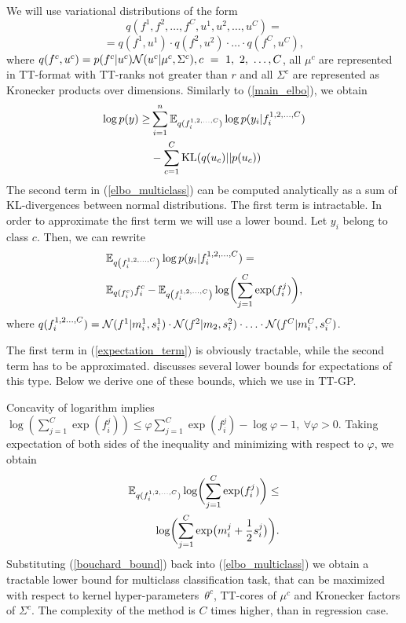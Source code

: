   We will use variational distributions of the form
  \[
    q(f^1, f^2, \ldots, f^C, u^1, u^2, \ldots, u^C) =
  \]
  \[
    = q(f^1, u^1) \cdot q(f^2, u^2) \cdot \ldots \cdot q(f^C, u^C),
  \]
  where $q(f^c, u^c) = p(f^c | u^c) \mathcal{N}(u^c | \mu^c, \Sigma^c), c~=~1,~2,~\ldots,\\C$,
  all $\mu^c$ are represented in TT-format with TT-ranks not greater than $r$
  and all  $\Sigma^c$ are represented as Kronecker products over dimensions. 
  Similarly to (\ref{main_elbo}), we obtain
  \begin{equation}
  \label{elbo_multiclass}
  \begin{split}
    \log p(y) \ge & \sum_{i = 1}^n \mathbb{E}_{q(f_i^{1, 2, \ldots, C})} \log p(y_i | f_i^{1, 2, \ldots, C})
    \\
    & - \sum_{c = 1}^{C} \mbox{KL}(q(u_c) || p(u_c))
  \end{split}
  \end{equation}
  The second term in (\ref{elbo_multiclass}) can be computed analytically as
  a sum of KL-divergences between normal distributions. The first term is
  intractable. In order to approximate the first term we will use a lower bound.
  Let $y_i$ belong to class $c$. Then, we can rewrite
  \begin{equation}
  \label{expectation_term}
  \begin{split}
    &\mathbb{E}_{q\left(f_i^{1, 2, \ldots, C}\right)} \log p(y_i | f_i^{1, 2, \ldots, C}) =\\
    &\mathbb{E}_{q(f_i^c)} f_i^c - \mathbb{E}_{q\left(f_i^{1, 2, \ldots, C}\right)}
    \log \biggl(\sum_{j=1}^C \exp (f_i^j) \biggr),
  \end{split}
  \end{equation}
  where $q(f_i^{1, 2\ldots, C}) = \mathcal{N}(f^1 | m_i^1, s_i^1)\cdot \mathcal{N}(f^2| m_2, s_i^2) \cdot \ldots \cdot \mathcal{N}(f^C | m_i^C, s_i^C)$.

  The first term in (\ref{expectation_term}) is obviously tractable, while the
  second term has to be approximated. \citet{bouchard2007} discusses several
  lower bounds for expectations of this type. Below we derive one of these bounds,
  which we use in TT-GP.

  Concavity of logarithm implies $\log\left(\sum_{j=1}^{C} \exp(f_i^j)\right) \le 
  \varphi \sum_{j=1}^C \exp(f_i^j) - \log \varphi - 1,\ \forall\varphi > 0$. 
  Taking expectation of both sides of the inequality and minimizing with respect
  to $\varphi$, we obtain
  \begin{equation}
  \label{bouchard_bound}
  \begin{split}
    \mathbb{E}_{q(f_i^{1, 2, \ldots, C})} \log\biggl(\sum_{j=1}^C \exp(f_i^j)\biggr) \le
    \\
    \log \biggl(\sum_{j=1}^C \exp\bigl(m_i^j + \frac 1 2 s_i^j\bigr) \biggr).
  \end{split}
  \end{equation}
  Substituting (\ref{bouchard_bound}) back into (\ref{elbo_multiclass}) we obtain
  a tractable lower bound for multiclass classification task, that can be
  maximized with respect to kernel hyper-parameters~$\theta^c$, TT-cores of
  $\mu^c$ and Kronecker factors of $\Sigma^c$. The complexity of the method
  is $C$ times higher, than in regression case.


